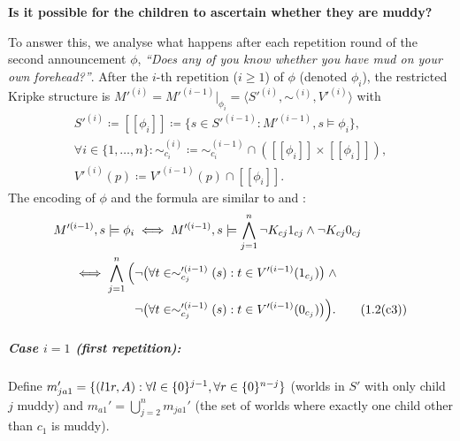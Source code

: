 \textbf{Is it possible for the children to ascertain whether they are muddy?}

To answer this, we analyse what happens after each repetition round of 
the second announcement $\phi$, 
\emph{``Does any of you know whether you have mud on your own forehead?''}.
After the $i$-th repetition ($i \ge 1$) of $\phi$ (denoted $\phi_i$), 
the restricted Kripke structure is 
$M'^{(i)} = M'^{(i-1)}|_{\phi_i} = \langle S'^{(i)}, 
\sim^{(i)}, V'^{(i)} \rangle$ with
\begin{gather*}
    S'^{(i)} \coloneqq [\![ \phi_i ]\!] \coloneqq 
    \{ s \in S'^{(i-1)} : M'^{(i-1)},s \models \phi_i \}, \\
    \forall i \in \{1,\dots,n\}: 
    \sim_{c_i}^{(i)} \coloneqq 
    \sim_{c_i}^{(i-1)} \cap ([\![ \phi_i ]\!] \times [\![ \phi_i ]\!]), \\
    V'^{(i)}(p) \coloneqq V'^{(i-1)}(p) \cap [\![ \phi_i ]\!].
\end{gather*}
The encoding of $\phi$ and the formula are similar to  and :
\begin{align*}
    M'^{(i-1)},s \models \phi_i 
    &\iff M'^{(i-1)},s \models \bigwedge\limits_{j=1}^{n} \neg K_{cj}1_{cj} \land \neg K_{cj}0_{cj} \\
    \iff \bigwedge_{j=1}^{n} \Big( 
        &\neg\bigl(\forall t \in \sim_{c_j}'^{(i-1)}(s): 
            t \in V'^{(i-1)}(1_{c_j})\bigr)
        \;\land\; \\
        &\neg\bigl(\forall t \in \sim_{c_j}'^{(i-1)}(s): 
            t \in V'^{(i-1)}(0_{c_j})\bigr) \Big). 
        \tag{1.2(c3)}\label{eq:1.2(c3)}
\end{align*}

\subparagraph{Case $i=1$ (first repetition):} 
Define 
\(m_{ja1}' = \{ (l1r,A) : \forall l \in \{0\}^{j-1}, \forall r \in \{0\}^{n-j} \}\) 
(worlds in $S'$ with only child $j$ muddy)
and
\(m_{a1}' = \bigcup_{j=2}^{n} m_{ja1}'\)
(the set of worlds where exactly one child other than $c_1$ is muddy).


